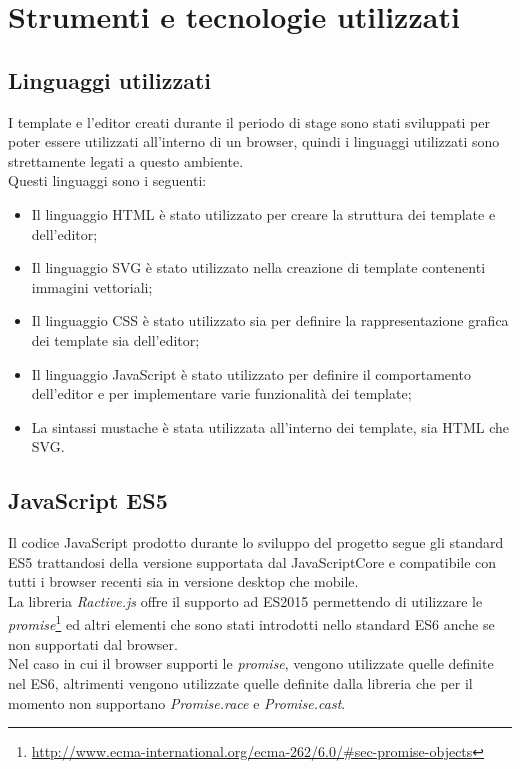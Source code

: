 
\chapter{Strumenti e tecnologie utilizzati}
\label{cap:strumenti-tecnologie}
\section{Linguaggi utilizzati}
I template e l'editor creati durante il periodo di stage sono stati sviluppati per poter essere utilizzati all'interno di un browser, quindi i linguaggi utilizzati sono strettamente legati a questo ambiente.\\
Questi linguaggi sono i seguenti:
\begin{itemize}
	\item Il linguaggio HTML è stato utilizzato per creare la struttura dei template e dell'editor;
	\item Il linguaggio SVG è stato utilizzato nella creazione di template contenenti immagini vettoriali;
	\item Il linguaggio CSS è stato utilizzato sia per definire la rappresentazione grafica dei template sia dell'editor;
	\item Il linguaggio JavaScript è stato utilizzato per definire il comportamento dell'editor e per implementare varie funzionalità dei template;
	\item La sintassi mustache è stata utilizzata all'interno dei template, sia  HTML che SVG. 
\end{itemize}

\section{JavaScript ES5}
Il codice JavaScript prodotto durante lo sviluppo del progetto segue gli standard ES5 trattandosi della versione supportata dal JavaScriptCore e compatibile con tutti i browser recenti sia in versione desktop che mobile.\\
La libreria \textit{Ractive.js} offre il supporto ad ES2015 permettendo di utilizzare le \textit{promise}\footnote{\url{http://www.ecma-international.org/ecma-262/6.0/\#sec-promise-objects}} ed altri elementi che sono stati introdotti nello standard ES6 anche se non supportati dal browser.\\
Nel caso in cui il browser supporti le \textit{promise}, vengono utilizzate quelle definite nel ES6, altrimenti vengono utilizzate quelle definite dalla libreria che per il momento non supportano \textit{Promise.race} e \textit{Promise.cast}.

